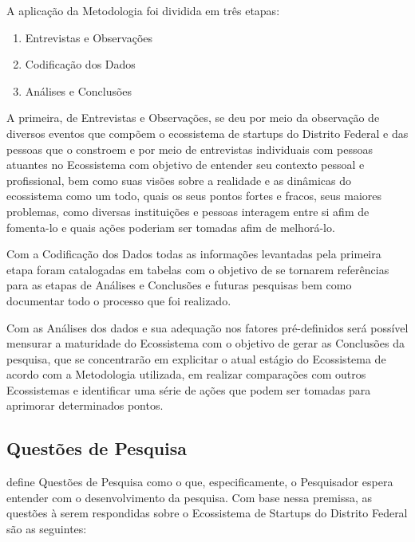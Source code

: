 A aplicação da Metodologia foi dividida em três etapas:

\begin{enumerate}
  \item Entrevistas e Observações
  \item Codificação dos Dados
  \item Análises e Conclusões
\end{enumerate}

A primeira, de Entrevistas e Observações, se deu por meio da observação de diversos eventos que compõem o ecossistema de startups do Distrito Federal e das pessoas que o constroem e por meio de entrevistas individuais com pessoas atuantes no Ecossistema com objetivo de entender seu contexto pessoal e profissional, bem como suas visões sobre a realidade e as dinâmicas do ecossistema como um todo, quais os seus pontos fortes e fracos, seus maiores problemas, como diversas instituições e pessoas interagem entre si afim de fomenta-lo e quais ações poderiam ser tomadas afim de melhorá-lo.

Com a Codificação dos Dados todas as informações levantadas pela primeira etapa foram catalogadas em tabelas com o objetivo de se tornarem referências para as etapas de Análises e Conclusões e futuras pesquisas bem como documentar todo o processo que foi realizado. 

Com as Análises dos dados e sua adequação nos fatores pré-definidos será possível mensurar a maturidade do Ecossistema com o objetivo de gerar as Conclusões da pesquisa, que se concentrarão em explicitar o atual estágio do Ecossistema de acordo com a Metodologia utilizada, em realizar comparações com outros Ecossistemas e identificar uma série de ações que podem ser tomadas para aprimorar determinados pontos.

\subsection{Questões de Pesquisa}
\label{subsection:questoes_de_pesquisa}

 define Questões de Pesquisa como o que, especificamente, o Pesquisador espera entender com o desenvolvimento da pesquisa. Com base nessa premissa, as questões à serem respondidas sobre o Ecossistema de Startups do Distrito Federal são as seguintes:

